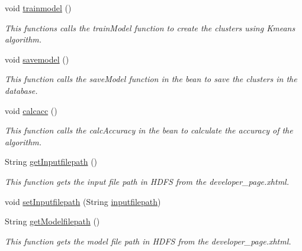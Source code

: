 \begin{DoxyCompactItemize}
\item 
void \hyperlink{classorg_1_1jboss_1_1as_1_1quickstarts_1_1greeter_1_1web_1_1_developer_controller_af45acb1518af25aee3f532b1a04fc9f5}{trainmodel} ()
\begin{DoxyCompactList}\small\item\em This functions calls the train\+Model function to create the clusters using Kmeans algorithm. \end{DoxyCompactList}\item 
void \hyperlink{classorg_1_1jboss_1_1as_1_1quickstarts_1_1greeter_1_1web_1_1_developer_controller_aa2470881e290068e50060883722953e0}{savemodel} ()
\begin{DoxyCompactList}\small\item\em This function calls the save\+Model function in the bean to save the clusters in the database. \end{DoxyCompactList}\item 
void \hyperlink{classorg_1_1jboss_1_1as_1_1quickstarts_1_1greeter_1_1web_1_1_developer_controller_a0204f7d1b8c5a8f0fa68270bd84c7c0c}{calcacc} ()
\begin{DoxyCompactList}\small\item\em This function calls the calc\+Accuracy in the bean to calculate the accuracy of the algorithm. \end{DoxyCompactList}\item 
String \hyperlink{classorg_1_1jboss_1_1as_1_1quickstarts_1_1greeter_1_1web_1_1_developer_controller_ad8bddc8376cd930a31ee581aebf630ab}{get\+Inputfilepath} ()
\begin{DoxyCompactList}\small\item\em This function gets the input file path in H\+D\+FS from the developer\+\_\+page.\+xhtml. \end{DoxyCompactList}\item 
void \hyperlink{classorg_1_1jboss_1_1as_1_1quickstarts_1_1greeter_1_1web_1_1_developer_controller_a292fd69a973406936fa1e1a0b0ec6b22}{set\+Inputfilepath} (String \hyperlink{classorg_1_1jboss_1_1as_1_1quickstarts_1_1greeter_1_1web_1_1_developer_controller_a61bbf99553c38751a4db3723fcf86ce2}{inputfilepath})
\item 
String \hyperlink{classorg_1_1jboss_1_1as_1_1quickstarts_1_1greeter_1_1web_1_1_developer_controller_a7e84dcd2c68bc4af89723a1fcd0fb3ae}{get\+Modelfilepath} ()
\begin{DoxyCompactList}\small\item\em This function gets the model file path in H\+D\+FS from the developer\+\_\+page.\+xhtml. \end{DoxyCompactList}\item 

\end{DoxyCompactItemize}
